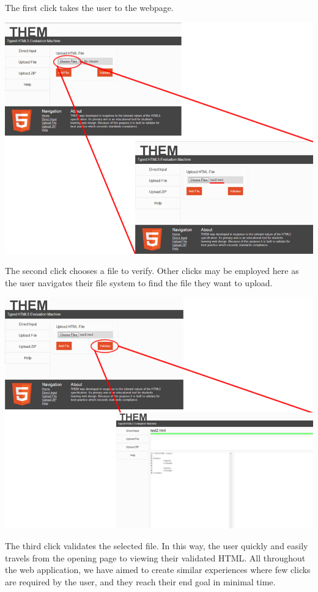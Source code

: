 \documentclass[10pt]{article}
\begin{document}
The first click takes the user to the webpage.

\includegraphics[scale=0.5]{click2.png}

The second click chooses a file to verify. Other clicks may be employed here as the user navigates their file system to find the file they want to upload.

\includegraphics[scale=0.5]{click3.png}

The third click validates the selected file. In this way, the user quickly and easily travels from the opening page to viewing their validated HTML. All throughout the web application, we have aimed to create similar experiences where few clicks are required by the user, and they reach their end goal in minimal time.
\end{document}
